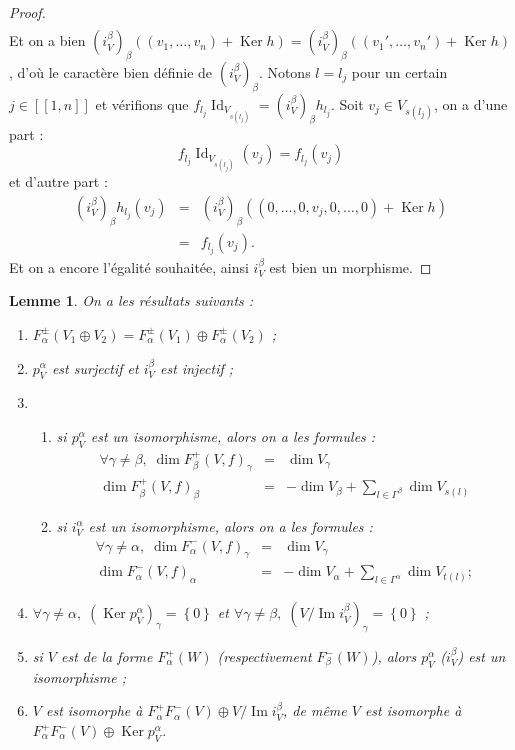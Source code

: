 \documentclass[a4paper,10pt]{article}
\newtheorem{lm}{Lemme}[section]
\DeclareMathOperator{\Ker}{Ker}
\DeclareMathOperator{\Id}{Id}
\DeclareMathOperator{\Img}{Im}
\begin{document}
\begin{proof}
\[\begin{array}{rll}
\end{array}
\]
Et on a bien $(i_{V}^{\beta})_{\beta}((v_{1},\dots,v_{n})+\Ker h)=(i_{V}^{\beta})_{\beta}((v_{1}',\dots,v_{n}')+\Ker h)
$, d'où le caractère bien définie de $(i_{V}^{\beta})_{\beta}$. Notons $l=l_{j}$ pour un certain $j\in[\![1,n]\!]$ et vérifions que $f_{l_{j}}\Id_{V_{s(l_{j})}}=(i_{V}^{\beta})_{\beta}h_{l_{j}}$. Soit $v_{j}\in V_{s(l_{j})}$, on a d'une part :
\[
	f_{l_{j}}\Id_{V_{s(l_{j})}}(v_{j})=f_{l_{j}}(v_{j})
\]
et d'autre part :
\[
\begin{array}{rll}
	(i_{V}^{\beta})_{\beta}h_{l_{j}}(v_{j})&=& (i_{V}^{\beta})_{\beta}((0,\dots,0,v_{j},0,\dots,0)+\Ker h)\\
	&=& f_{l_{j}}(v_{j}).
\end{array}
\]
Et on a encore l'égalité souhaitée, ainsi $i_{V}^{\beta}$ est bien un morphisme.
\end{proof}
\begin{lm}
	On a les résultats suivants :
	\begin{enumerate}
		\item $F_{\alpha}^{\pm}(V_{1}\oplus V_{2})=F_{\alpha}^{\pm}(V_{1})\oplus F_{\alpha}^{\pm}(V_{2})$ ;
		\item $p_{V}^{\alpha}$ est surjectif et $i_{V}^{\beta}$ est injectif ;
		\item \begin{enumerate}
				\item si $p_{V}^{\alpha}$ est un isomorphisme, alors on a les formules :
					\[
\begin{array}{rll}
	\forall\gamma\neq\beta,\;\dim F_{\beta}^{+}(V,f)_{\gamma}&=& \dim V_{\gamma}\\
	\dim F_{\beta}^{+}(V,f)_{\beta}&=& -\dim V_{\beta}+\sum_{l\in\Gamma^{\beta}}\dim V_{s(l)}
\end{array}
					\]
				\item si $i_{V}^{\alpha}$ est un isomorphisme, alors on a les formules :
	\[
\begin{array}{rll}
	\forall\gamma\neq\alpha,\;\dim F_{\alpha}^{-}(V,f)_{\gamma}&=& \dim V_{\gamma}\\
	\dim F_{\alpha}^{-}(V,f)_{\alpha}&=& -\dim V_{\alpha}+\sum_{l\in\Gamma^{\alpha}}\dim V_{t(l)};
\end{array}
					\]
			\end{enumerate}
		\item $\forall \gamma\neq\alpha,\;(\Ker p_{V}^{\alpha})_{\gamma}=\left\{ 0 \right\}$ et $\forall \gamma\neq\beta,\;(V/\Img i_{V}^{\beta})_{\gamma}=\left\{ 0 \right\}$ ;
		\item si $V$ est de la forme $F_{\alpha}^{+}(W)$ (respectivement $F_{\beta}^{-}(W)$), alors $p_{V}^{\alpha}$ ($i_{V}^{\beta}$) est un isomorphisme ;
		\item $V$ est isomorphe à $F_{\alpha}^{+}F_{\alpha}^{-}(V)\oplus V/\Img i_{V}^{\beta}$, de même $V$ est isomorphe à $F_{\alpha}^{+}F_{\alpha}^{-}(V)\oplus \Ker p_{V}^{\alpha}$.
	\end{enumerate}
\end{lm}
\end{document}
